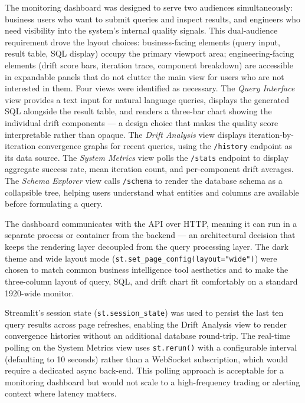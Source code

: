 \documentclass[12pt,a4paper]{report}
\begin{document}
The monitoring dashboard was designed to serve two audiences simultaneously: business users who want to submit queries and inspect results, and engineers who need visibility into the system's internal quality signals. This dual-audience requirement drove the layout choices: business-facing elements (query input, result table, SQL display) occupy the primary viewport area; engineering-facing elements (drift score bars, iteration trace, component breakdown) are accessible in expandable panels that do not clutter the main view for users who are not interested in them. Four views were identified as necessary. The \textit{Query Interface} view provides a text input for natural language queries, displays the generated \ac{SQL} alongside the result table, and renders a three-bar chart showing the individual drift components — a design choice that makes the quality score interpretable rather than opaque. The \textit{Drift Analysis} view displays iteration-by-iteration convergence graphs for recent queries, using the \texttt{/history} endpoint as its data source. The \textit{System Metrics} view polls the \texttt{/stats} endpoint to display aggregate success rate, mean iteration count, and per-component drift averages. The \textit{Schema Explorer} view calls \texttt{/schema} to render the database schema as a collapsible tree, helping users understand what entities and columns are available before formulating a query.

The dashboard communicates with the \ac{API} over HTTP, meaning it can run in a separate process or container from the backend — an architectural decision that keeps the rendering layer decoupled from the query processing layer. The dark theme and wide layout mode (\texttt{st.set\_page\_config(layout="wide")}) were chosen to match common business intelligence tool aesthetics and to make the three-column layout of query, \ac{SQL}, and drift chart fit comfortably on a standard 1920-wide monitor.

Streamlit's session state (\texttt{st.session\_state}) was used to persist the last ten query results across page refreshes, enabling the Drift Analysis view to render convergence histories without an additional database round-trip. The real-time polling on the System Metrics view uses \texttt{st.rerun()} with a configurable interval (defaulting to 10 seconds) rather than a WebSocket subscription, which would require a dedicated async back-end. This polling approach is acceptable for a monitoring dashboard but would not scale to a high-frequency trading or alerting context where latency matters.
\end{document}
